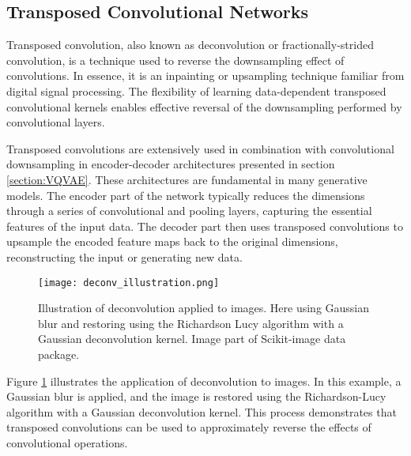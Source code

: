 \documentclass[../../thesis.tex]{subfiles}
\begin{document}
\subsection{Transposed Convolutional Networks}
Transposed convolution, also known as deconvolution or fractionally-strided convolution, is a technique used to reverse the downsampling effect of convolutions. In essence, it is an inpainting or upsampling technique familiar from digital signal processing. The flexibility of learning data-dependent transposed convolutional kernels enables effective reversal of the downsampling performed by convolutional layers.\newline

Transposed convolutions are extensively used in combination with convolutional downsampling in encoder-decoder architectures presented in section \ref{section:VQVAE}. These architectures are fundamental in many generative models. The encoder part of the network typically reduces the dimensions through a series of convolutional and pooling layers, capturing the essential features of the input data. The decoder part then uses transposed convolutions to upsample the encoded feature maps back to the original dimensions, reconstructing the input or generating new data.\newline

\begin{figure}[h]
    \centering
    \texttt{[image: deconv\_illustration.png]}
    \caption{Illustration of deconvolution applied to images. Here using Gaussian blur and restoring using the Richardson Lucy algorithm with a Gaussian deconvolution kernel. Image part of Scikit-image data package.}
    \label{fig:deconv}
\end{figure}

Figure \ref{fig:deconv} illustrates the application of deconvolution to images. In this example, a Gaussian blur is applied, and the image is restored using the Richardson-Lucy algorithm with a Gaussian deconvolution kernel. This process demonstrates that transposed convolutions can be used to approximately reverse the effects of convolutional operations.



\end{document}
